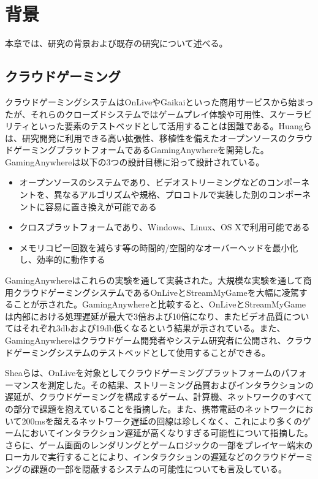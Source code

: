 \section{背景}
本章では、研究の背景および既存の研究について述べる。

\subsection{クラウドゲーミング}
クラウドゲーミングシステムはOnLiveやGaikaiといった商用サービスから始まったが、それらのクローズドシステムではゲームプレイ体験や可用性、スケーラビリティといった要素のテストベッドとして活用することは困難である。Huangら\cite{gaminganywhere}は、研究開発に利用できる高い拡張性、移植性を備えたオープンソースのクラウドゲーミングプラットフォームであるGamingAnywhereを開発した。GamingAnywhereは以下の3つの設計目標に沿って設計されている。
\begin{itemize}
    \item オープンソースのシステムであり、ビデオストリーミングなどのコンポーネントを、異なるアルゴリズムや規格、プロコトルで実装した別のコンポーネントに容易に置き換えが可能である
    \item クロスプラットフォームであり、Windows、Linux、OS Xで利用可能である
    \item メモリコピー回数を減らす等の時間的/空間的なオーバーヘッドを最小化し、効率的に動作する
\end{itemize}
GamingAnywhereはこれらの実験を通して実装された。大規模な実験を通して商用クラウドゲーミングシステムであるOnLiveとStreamMyGameを大幅に凌駕することが示された。GamingAnywhereと比較すると、OnLiveとStreamMyGameは内部における処理遅延が最大で3倍および10倍になり、またビデオ品質についてはそれぞれ3dbおよび19db低くなるという結果が示されている。また、GamingAnywhereはクラウドゲーム開発者やシステム研究者に公開され、クラウドゲーミングシステムのテストベッドとして使用することができる。

Sheaら\cite{cloudperformance}は、OnLiveを対象としてクラウドゲーミングプラットフォームのパフォーマンスを測定した。その結果、ストリーミング品質およびインタラクションの遅延が、クラウドゲーミングを構成するゲーム、計算機、ネットワークのすべての部分で課題を抱えていることを指摘した。また、携帯電話のネットワークにおいて200msを超えるネットワーク遅延の回線は珍しくなく、これにより多くのゲームにおいてインタラクション遅延が高くなりすぎる可能性について指摘した。さらに、ゲーム画面のレンダリングとゲームロジックの一部をプレイヤー端末のローカルで実行することにより、インタラクションの遅延などのクラウドゲーミングの課題の一部を隠蔽するシステムの可能性についても言及している。

